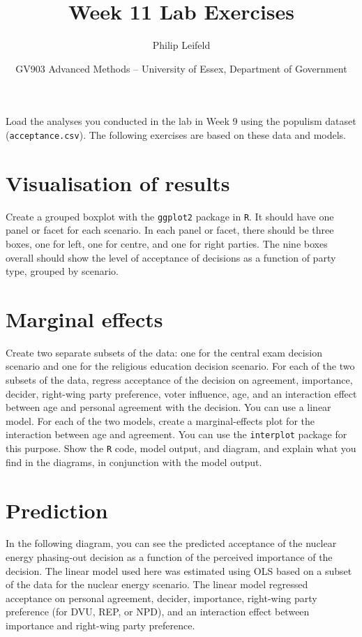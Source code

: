 \documentclass[a4paper,11pt]{article}
\title{Week 11 Lab Exercises}
\author{Philip Leifeld}
\date{GV903 Advanced Methods -- University of Essex, Department of Government}
\begin{document}
\maketitle

Load the analyses you conducted in the lab in Week 9 using the populism dataset (\verb+acceptance.csv+). The following exercises are based on these data and models.

\section{Visualisation of results}
Create a grouped boxplot with the \texttt{ggplot2} package in \texttt{R}. It should have one panel or facet for each scenario. In each panel or facet, there should be three boxes, one for left, one for centre, and one for right parties. The nine boxes overall should show the level of acceptance of decisions as a function of party type, grouped by scenario.

\section{Marginal effects}
Create two separate subsets of the data: one for the central exam decision scenario and one for the religious education decision scenario. For each of the two subsets of the data, regress acceptance of the decision on agreement, importance, decider, right-wing party preference, voter influence, age, and an interaction effect between age and personal agreement with the decision. You can use a linear model. For each of the two models, create a marginal-effects plot for the interaction between age and agreement. You can use the \texttt{interplot} package for this purpose. Show the \texttt{R} code, model output, and diagram, and explain what you find in the diagrams, in conjunction with the model output.

\section{Prediction}
In the following diagram, you can see the predicted acceptance of the nuclear energy phasing-out decision as a function of the perceived importance of the decision. The linear model used here was estimated using OLS based on a subset of the data for the nuclear energy scenario. The linear model regressed acceptance on personal agreement, decider, importance, right-wing party preference (for DVU, REP, or NPD), and an interaction effect between importance and right-wing party preference.
\end{document}
